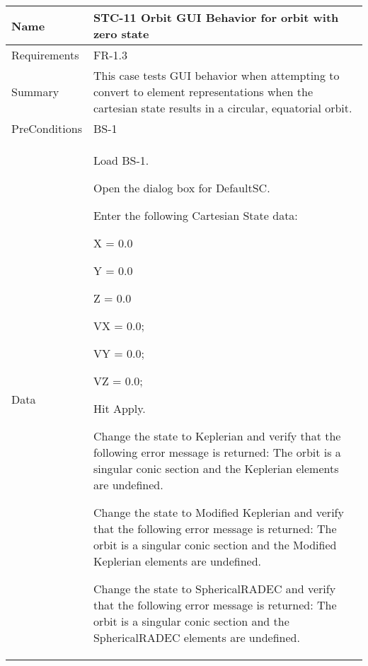 





\begin{table}[htbp!]
\centering
      \begin{tabular}{|p{1.05 in} |p{4.75 in} |}
      \hline
         \rowcolor[rgb]{0.8,0.8,0.8} Name & STC-11 Orbit GUI Behavior for orbit with zero state\\
         \hline
         Requirements & FR-1.3\\  \hline
         Summary &
         This  case tests GUI behavior when attempting to convert to element representations when the
         cartesian state results in a circular, equatorial orbit.
         \\     \hline
         PreConditions & BS-1\\     \hline
         Data &
         \begin{compactenum}
             \item Load BS-1.
             \item Open the dialog box for DefaultSC.
             \item Enter the following Cartesian State data:
                      \begin{compactenum}
                         \item X = 0.0
                         \item Y = 0.0
                         \item Z = 0.0
                         \item VX = 0.0;
                         \item VY = 0.0;
                         \item VZ = 0.0;
                      \end{compactenum}
             \item Hit Apply.
             \item Change the state to Keplerian and verify that the following error message is returned: The orbit is a singular conic section and the Keplerian elements are undefined.
             \item Change the state to Modified Keplerian and verify that the following error message is returned: The orbit is a singular conic section and the Modified Keplerian elements are undefined.
             \item Change the state to SphericalRADEC and verify that the following error message is returned: The orbit is a singular conic section and the SphericalRADEC elements are undefined.

\end{compactenum}
\end{tabular}
\end{table}
